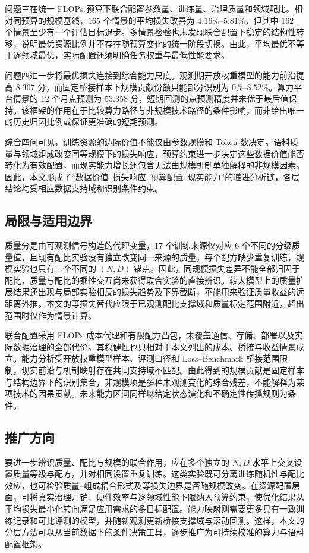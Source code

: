 \documentclass[bwprint]{gmcmthesis}
\begin{document}
问题三在统一 FLOPs 预算下联合配置参数量、训练量、治理质量和领域配比。相对同预算的规模基线，$165$ 个情景的平均损失改善为 $4.16\%$--$5.81\%$，但其中 $162$ 个情景至少有一个评估目标退步。多情景检验也未发现联合配置下稳定的结构性转移，说明最优资源比例并不存在随预算变化的统一阶段切换。由此，平均最优不等于逐领域最优，实际配置还须明确任务权重与最低性能要求。

问题四进一步将最优损失连接到综合能力尺度。观测期开放权重模型的能力前沿提高 $8.307$ 分，而固定桥接样本下规模贡献份额只能部分识别为 $0\%$--$8.52\%$。算力平台情景的 12 个月点预测为 $53.358$ 分，短期回测的点预测精度并未优于最后值保持。该框架的作用在于比较算力路径与非规模技术路径的条件影响，而非给出唯一的历史归因比例或保证更准确的短期预测。

综合四问可见，训练资源的边际价值不能仅由参数规模和 Token 数决定。语料质量与领域组成改变同等规模下的损失响应，预算约束进一步决定这些数据价值能否转化为有效配置，而现实能力增长还包含无法由规模机制单独解释的非规模因素。因此，本文形成了“数据价值--损失响应--预算配置--现实能力”的递进分析链，各层结论均受相应数据支持域和识别条件约束。

\subsection{局限与适用边界}

质量分是由可观测信号构造的代理变量，17 个训练来源仅对应 6 个不同的分级质量值，且现有配比实验没有独立改变同一来源的质量。每个配方缺少重复训练，规模实验也只有三个不同的 $(N,D)$ 锚点。因此，同规模损失差异不能全部归因于配比，质量与配比的乘性交互尚未获得联合实验的直接辨识。较大模型上的质量扩展结果还出现与局部实验相反的损失趋势及下界截断，不能用来验证质量收益的远距离外推。本文的等损失替代应限于已观测配比支撑域和质量标定范围附近，超出范围时仅作为情景计算。

联合配置采用 FLOPs 成本代理和有限配方凸包，未覆盖通信、存储、部署以及实际数据治理的全部代价。其稳健性也只相对于本文列出的成本、桥接与收益情景成立。能力分析受开放权重模型样本、评测口径和 Loss--Benchmark 桥接范围限制，现实前沿与机制映射存在共同支持域不匹配。由此得到的规模贡献是固定样本与结构边界下的识别集合，非规模项是多种未观测变化的综合残差，不能解释为某项技术的因果贡献。未来能力区间同样以给定状态演化和不确定性传播规则为条件。

\subsection{推广方向}

要进一步辨识质量、配比与规模的联合作用，应在多个独立的 $N,D$ 水平上交叉设置质量等级与配方，并对相同设置重复训练。这类实验既可分离训练随机性与配比效应，也可检验质量--组成耦合形式及等损失边界是否随规模改变。在资源配置层面，可将真实治理开销、硬件效率与逐领域性能下限纳入预算约束，使优化结果从平均损失最小化转向满足应用需求的多目标配置。能力映射则需要更多具有一致训练记录和可比评测的模型，并随新观测更新桥接支撑域与滚动回测。这样，本文的分层方法可以从当前数据下的条件决策工具，逐步推广为可持续校准的算力与语料配置框架。
\end{document}
